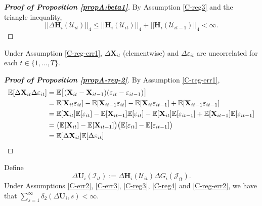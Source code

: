 \documentclass[a4paper,12pt]{article}
\begin{document}
\begin{proof}[\textnormal{\textbf{Proof of Proposition \ref{propA:beta1}}}]
By Assumption \ref{C-reg3} and the triangle inequality,
\[
 || \Delta \mathbf{H}_i(\mathcal{U}_{it})||_4 \leq  ||\mathbf{H}_i(\mathcal{U}_{it})||_4 +  || \mathbf{H}_i(\mathcal{U}_{it-1})||_4 < \infty.
\]
\end{proof} 

 \begin{propA}\label{propA-reg-2}
Under Assumption \ref{C-reg-err1}, $\Delta \mathbf{X}_{it}$ (elementwise) and $\Delta \varepsilon_{it}$ are uncorrelated for each $t\in \{1, \ldots, T\}$.
\end{propA}

\begin{proof}[\textnormal{\textbf{Proof of Proposition \ref{propA-reg-2}}}]
By Assumption \ref{C-reg-err1},
\begin{align*}
\mathbb{E} [\Delta \mathbf{X}_{it}\Delta \varepsilon_{it}] &= \mathbb{E} \big[(\mathbf{X}_{it} - \mathbf{X}_{it-1}) (\varepsilon_{it} - \varepsilon_{it-1})\big] \\
&=\mathbb{E}[\mathbf{X}_{it}  \varepsilon_{it}] - \mathbb{E}[\mathbf{X}_{it-1}  \varepsilon_{it}]- \mathbb{E}[\mathbf{X}_{it}  \varepsilon_{it-1}] + \mathbb{E}[\mathbf{X}_{it-1}  \varepsilon_{it-1}] \\
&= \mathbb{E}[\mathbf{X}_{it}]\mathbb{E}[  \varepsilon_{it}] - \mathbb{E}[\mathbf{X}_{it-1}]\mathbb{E}[  \varepsilon_{it}]- \mathbb{E}[\mathbf{X}_{it}]\mathbb{E}[  \varepsilon_{it-1}] + \mathbb{E}[\mathbf{X}_{it-1}]\mathbb{E}[  \varepsilon_{it-1}] \\
&= \big( \mathbb{E}[\mathbf{X}_{it}] - \mathbb{E}[\mathbf{X}_{it-1}]\big)\big(\mathbb{E}[  \varepsilon_{it}]  - \mathbb{E}[\varepsilon_{it-1}]\big) \\
&= \mathbb{E} [\Delta \mathbf{X}_{it}]\mathbb{E}[\Delta \varepsilon_{it}]
\end{align*}
\end{proof} 


\begin{propA}\label{propA-reg-3}
Define 
\[ \Delta \mathbf{U}_i(\mathcal{I}_{it}) := \Delta \mathbf{H}_i(\mathcal{U}_{it}) \Delta G_i(\mathcal{J}_{it}).
\]
Under Assumptions \ref{C-err2}, \ref{C-err3}, \ref{C-reg3}, \ref{C-reg4} and \ref{C-reg-err2}, we have that \linebreak $\sum_{s=1}^\infty \delta_2(\Delta \mathbf{U}_i, s) < \infty$.
\end{propA}
\end{document}
